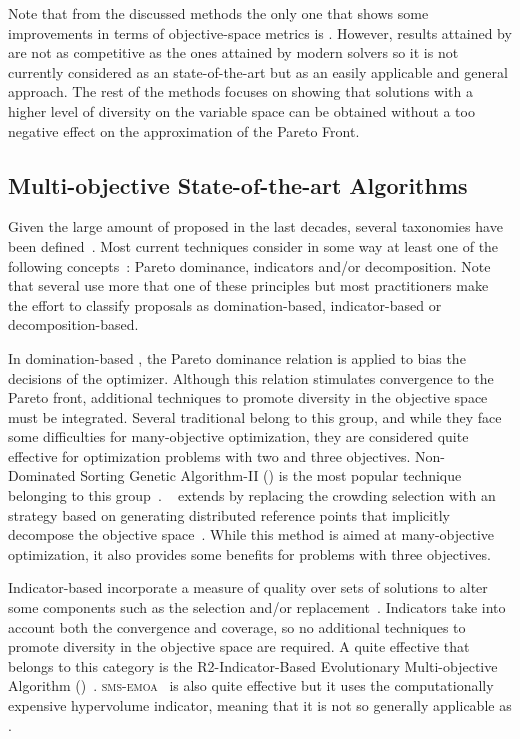 Note that from the discussed methods the only one that shows some improvements in terms of objective-space metrics is \GDEA{}.
%
However, results attained by \GDEA{} are not as competitive as the ones attained by modern solvers so it is not currently
considered as an state-of-the-art \MOEA{} but as an easily applicable and general approach.
%
The rest of the methods focuses on showing that solutions with a higher level of diversity on the variable space
can be obtained without a too negative effect
on the approximation of the Pareto Front.


\subsection{Multi-objective State-of-the-art Algorithms}

Given the large amount of \MOEAS{} proposed in the last decades, several taxonomies have been defined~\cite{bechikh2016recent}.
%
Most current techniques consider in some way at least one of the following concepts~\cite{trivedi2016survey}:
Pareto dominance, indicators and/or decomposition.
%
Note that several \MOEAS{} use more that one of these principles but most practitioners make the effort to classify
proposals as domination-based, indicator-based or decomposition-based.

In domination-based \MOEAS{}, the Pareto dominance relation is applied to bias the decisions of the optimizer.
%
Although this relation stimulates convergence to the Pareto front, additional techniques to promote
diversity in the objective space must be integrated.
%
Several traditional \MOEAS{} belong to this group, and while they face some difficulties for many-objective
optimization, they are considered quite effective for optimization problems with two and three objectives.
%
Non-Dominated Sorting Genetic Algorithm-II (\NSGAII{}) is the most popular technique belonging to this group~\cite{deb2002fast}.
%
\NSGAIII{}~\cite{deb2013evolutionary} extends \NSGAII{} by replacing the crowding selection with an strategy 
based on generating distributed reference points that implicitly decompose the objective space~\cite{trivedi2016survey}.
%
While this method is aimed at many-objective optimization, it also provides some benefits for problems with three objectives.

Indicator-based \MOEAS{} incorporate a measure of quality over sets of solutions to alter some components such as the 
selection and/or replacement~\cite{zitzler2004indicator}.
%
Indicators take into account both the convergence and coverage, so no additional techniques to promote diversity
in the objective space are required.
%
A quite effective \MOEA{} that belongs to this category is the R2-Indicator-Based Evolutionary Multi-objective 
Algorithm (\RMOEA{})~\cite{trautmann2013r2}.
%
\textsc{sms-emoa}~\cite{beume:07} is also quite effective 
but it uses the computationally expensive hypervolume indicator, meaning that it is not so generally applicable as \RMOEA{}.

